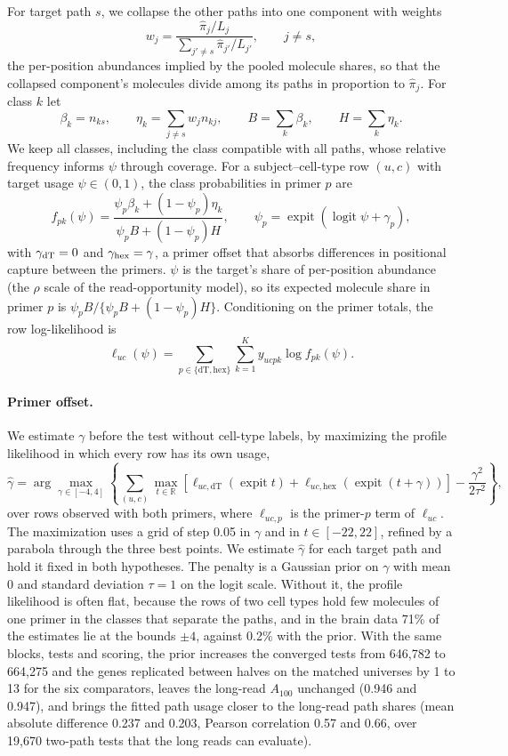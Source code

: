 \documentclass[11pt]{article}
\newcommand{\expit}{\operatorname{expit}}
\newcommand{\logit}{\operatorname{logit}}
\begin{document}
For target path $s$, we collapse the other paths into one component with weights \[w_j=\frac{\widehat\pi_j/L_j}{\sum_{j'\ne s}\widehat\pi_{j'}/L_{j'}},\qquad j\neq s,\] the per-position abundances implied by the pooled molecule shares, so that the collapsed component's molecules divide among its paths in proportion to $\widehat\pi_j$. For class $k$ let \[\beta_k=n_{ks},\qquad \eta_k=\sum_{j\ne s}w_jn_{kj},\qquad B=\sum_k\beta_k,\qquad H=\sum_k\eta_k.\] We keep all classes, including the class compatible with all paths, whose relative frequency informs $\psi$ through coverage. For a subject--cell-type row $(u,c)$ with target usage $\psi\in(0,1)$, the class probabilities in primer $p$ are \[f_{pk}(\psi)=\frac{\psi_p\beta_k+(1-\psi_p)\eta_k}{\psi_pB+(1-\psi_p)H},\qquad \psi_p=\expit(\logit\psi+\gamma_p),\] with $\gamma_{\rm dT}=0$ and $\gamma_{\rm hex}=\gamma$, a primer offset that absorbs differences in positional capture between the primers. $\psi$ is the target's share of per-position abundance (the $\rho$ scale of the read-opportunity model), so its expected molecule share in primer $p$ is $\psi_pB/\{\psi_pB+(1-\psi_p)H\}$. Conditioning on the primer totals, the row log-likelihood is \[\ell_{uc}(\psi)=\sum_{p\in\{\mathrm{dT},\mathrm{hex}\}}\sum_{k=1}^Ky_{ucpk}\log f_{pk}(\psi).\]
\paragraph{Primer offset.} We estimate $\gamma$ before the test without cell-type labels, by maximizing the profile likelihood in which every row has its own usage, \[\widehat\gamma=\arg\max_{\gamma\in[-4,4]}\left\{\sum_{(u,c)}\max_{t\in\mathbb R}\left[\ell_{uc,\mathrm{dT}}(\expit t)+\ell_{uc,\mathrm{hex}}(\expit(t+\gamma))\right]-\frac{\gamma^2}{2\tau^2}\right\},\] over rows observed with both primers, where $\ell_{uc,p}$ is the primer-$p$ term of $\ell_{uc}$. The maximization uses a grid of step 0.05 in $\gamma$ and in $t\in[-22,22]$, refined by a parabola through the three best points. We estimate $\widehat\gamma$ for each target path and hold it fixed in both hypotheses. The penalty is a Gaussian prior on $\gamma$ with mean 0 and standard deviation $\tau=1$ on the logit scale. Without it, the profile likelihood is often flat, because the rows of two cell types hold few molecules of one primer in the classes that separate the paths, and in the brain data 71\% of the estimates lie at the bounds $\pm4$, against 0.2\% with the prior. With the same blocks, tests and scoring, the prior increases the converged tests from 646{,}782 to 664{,}275 and the genes replicated between halves on the matched universes by 1 to 13 for the six comparators, leaves the long-read $A_{100}$ unchanged (0.946 and 0.947), and brings the fitted path usage closer to the long-read path shares (mean absolute difference 0.237 and 0.203, Pearson correlation 0.57 and 0.66, over 19{,}670 two-path tests that the long reads can evaluate).
\end{document}

